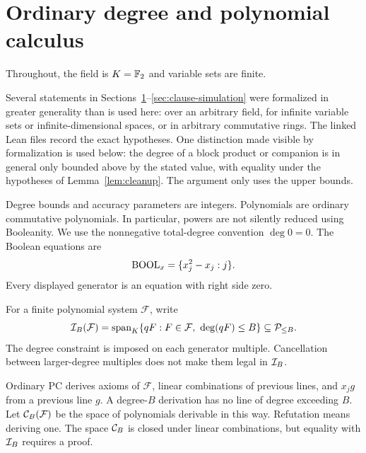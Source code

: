 \section{Ordinary degree and polynomial calculus}\label{sec:algebra}

Throughout, the field is \(K=\mathbb F_2\) and variable sets are finite.
\begin{remark}[Generality]\label{rem:generality}
Several statements in Sections~\ref{sec:algebra}--\ref{sec:clause-simulation}
were formalized in greater generality than is used here: over an arbitrary
field, for infinite variable sets or infinite-dimensional spaces, or in
arbitrary commutative rings. The linked Lean files record the exact
hypotheses. One distinction made visible by formalization is used below:
the degree of a block product or companion is in general only bounded above
by the stated value, with equality under the hypotheses of
Lemma~\ref{lem:cleanup}. The argument only uses the upper bounds.
\end{remark}
Degree bounds and accuracy parameters are integers.
Polynomials are ordinary commutative polynomials. In particular, powers are
not silently reduced using Booleanity. We use the nonnegative total-degree
convention \(\deg0=0\). The Boolean equations are
\[
 \operatorname{BOOL}_x=\{x_j^2-x_j:j\}.
\]
Every displayed generator is an equation with right side zero.

For a finite polynomial system \(\mathcal F\), write
\begin{equation}\label{eq:ns-space}
 \mathcal I_B(\mathcal F)
  =\operatorname{span}_K\{qF:F\in\mathcal F,\ \deg(qF)\le B\}
   \subseteq\mathcal P_{\le B}.
\end{equation}
The degree constraint is imposed on each generator multiple. Cancellation
between larger-degree multiples does not make them legal in
\(\mathcal I_B\).

Ordinary PC derives axioms of \(\mathcal F\), linear combinations of
previous lines, and \(x_jg\) from a previous line \(g\).
A degree-\(B\) derivation has no line of degree exceeding \(B\).
Let \(\mathcal C_B(\mathcal F)\) be the space of polynomials derivable in this
way. Refutation means deriving one. The space \(\mathcal C_B\) is closed under
linear combinations, but equality with \(\mathcal I_B\) requires a proof.

